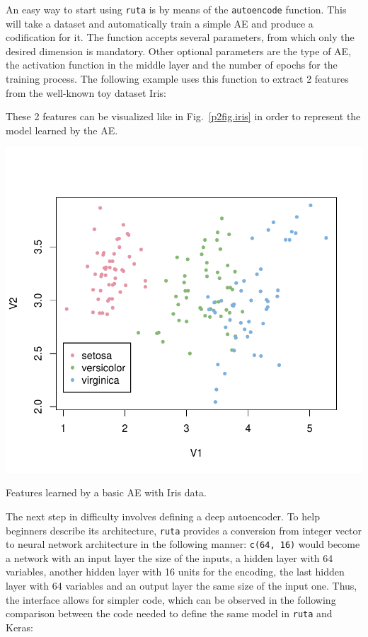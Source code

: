 An easy way to start using \texttt{ruta} is by means of the \texttt{autoencode} function. This will take a dataset and  automatically train a simple AE and produce a codification for it. The function accepts several parameters, from which only the desired dimension is mandatory. Other optional parameters are the type of AE, the activation function in the middle layer and the number of epochs for the training process. The following example uses this function to extract 2 features from the well-known toy dataset Iris:



These 2 features can be visualized like in Fig.~\ref{p2fig.iris} in order to represent the model learned by the AE.

\begin{marginfigure}
  \centering
  \includegraphics[width=\textwidth]{iris.pdf}
  \caption{Features learned by a basic AE with Iris data.}
  \label{p2fig.iris}
\end{marginfigure}

{The next step in difficulty involves defining a deep autoencoder. To help beginners describe its architecture, \texttt{ruta} provides a conversion from integer vector to neural network architecture in the following manner: \texttt{c(64, 16)} would become a network with an input layer the size of the inputs, a hidden layer with 64 variables, another hidden layer with 16 units for the encoding, the last hidden layer with 64 variables and an output layer the same size of the input one. Thus, the interface allows for simpler code, which can be observed in the following comparison between the code needed to define the same model in \texttt{ruta} and Keras:
}

